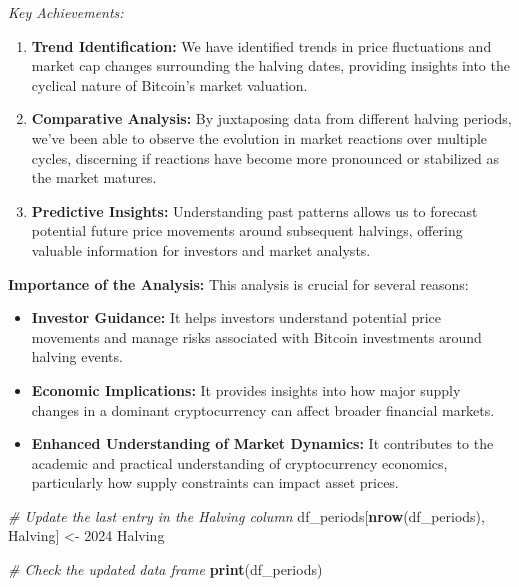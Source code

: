 \documentclass[
]{article}
\newenvironment{Shaded}{\begin{snugshade}}{\end{snugshade}}
\newcommand{\CommentTok}[1]{\textcolor[rgb]{0.56,0.35,0.01}{\textit{#1}}}
\newcommand{\FunctionTok}[1]{\textcolor[rgb]{0.13,0.29,0.53}{\textbf{#1}}}
\newcommand{\NormalTok}[1]{#1}
\newcommand{\OtherTok}[1]{\textcolor[rgb]{0.56,0.35,0.01}{#1}}
\newcommand{\StringTok}[1]{\textcolor[rgb]{0.31,0.60,0.02}{#1}}
\begin{document}
\emph{Key Achievements:}

\begin{enumerate}
\def\labelenumi{\arabic{enumi}.}
\item
  \textbf{Trend Identification:} We have identified trends in price
  fluctuations and market cap changes surrounding the halving dates,
  providing insights into the cyclical nature of Bitcoin's market
  valuation.
\item
  \textbf{Comparative Analysis:} By juxtaposing data from different
  halving periods, we've been able to observe the evolution in market
  reactions over multiple cycles, discerning if reactions have become
  more pronounced or stabilized as the market matures.
\item
  \textbf{Predictive Insights:} Understanding past patterns allows us to
  forecast potential future price movements around subsequent halvings,
  offering valuable information for investors and market analysts.
\end{enumerate}

\textbf{Importance of the Analysis:} This analysis is crucial for
several reasons:

\begin{itemize}
\item
  \textbf{Investor Guidance:} It helps investors understand potential
  price movements and manage risks associated with Bitcoin investments
  around halving events.
\item
  \textbf{Economic Implications:} It provides insights into how major
  supply changes in a dominant cryptocurrency can affect broader
  financial markets.
\item
  \textbf{Enhanced Understanding of Market Dynamics:} It contributes to
  the academic and practical understanding of cryptocurrency economics,
  particularly how supply constraints can impact asset prices.
\end{itemize}

\begin{Shaded}
\begin{Highlighting}[]
\CommentTok{\# Update the last entry in the \textquotesingle{}Halving\textquotesingle{} column}
\NormalTok{df\_periods[}\FunctionTok{nrow}\NormalTok{(df\_periods), }\StringTok{\textquotesingle{}Halving\textquotesingle{}}\NormalTok{] }\OtherTok{\textless{}{-}} \StringTok{\textquotesingle{}2024 Halving\textquotesingle{}}

\CommentTok{\# Check the updated data frame}
\FunctionTok{print}\NormalTok{(df\_periods)}
\end{Highlighting}
\end{Shaded}
\end{document}
